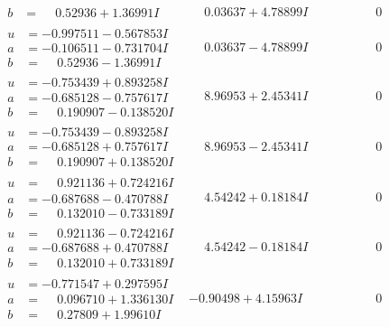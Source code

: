 \documentclass[1p]{elsarticle_modified}
\theoremstyle{definition}
\begin{document}
$$\begin{array}{c|c|c}
\begin{aligned}
b &= \phantom{-}0.52936 + 1.36991 I\end{aligned}
 & \phantom{-}0.03637 + 4.78899 I & \phantom{-0.000000 } 0 \\ \hline\begin{aligned}
u &= -0.997511 - 0.567853 I \\
a &= -0.106511 - 0.731704 I \\
b &= \phantom{-}0.52936 - 1.36991 I\end{aligned}
 & \phantom{-}0.03637 - 4.78899 I & \phantom{-0.000000 } 0 \\ \hline\begin{aligned}
u &= -0.753439 + 0.893258 I \\
a &= -0.685128 - 0.757617 I \\
b &= \phantom{-}0.190907 - 0.138520 I\end{aligned}
 & \phantom{-}8.96953 + 2.45341 I & \phantom{-0.000000 } 0 \\ \hline\begin{aligned}
u &= -0.753439 - 0.893258 I \\
a &= -0.685128 + 0.757617 I \\
b &= \phantom{-}0.190907 + 0.138520 I\end{aligned}
 & \phantom{-}8.96953 - 2.45341 I & \phantom{-0.000000 } 0 \\ \hline\begin{aligned}
u &= \phantom{-}0.921136 + 0.724216 I \\
a &= -0.687688 - 0.470788 I \\
b &= \phantom{-}0.132010 - 0.733189 I\end{aligned}
 & \phantom{-}4.54242 + 0.18184 I & \phantom{-0.000000 } 0 \\ \hline\begin{aligned}
u &= \phantom{-}0.921136 - 0.724216 I \\
a &= -0.687688 + 0.470788 I \\
b &= \phantom{-}0.132010 + 0.733189 I\end{aligned}
 & \phantom{-}4.54242 - 0.18184 I & \phantom{-0.000000 } 0 \\ \hline\begin{aligned}
u &= -0.771547 + 0.297595 I \\
a &= \phantom{-}0.096710 + 1.336130 I \\
b &= \phantom{-}0.27809 + 1.99610 I\end{aligned}
 & -0.90498 + 4.15963 I & \phantom{-0.000000 } 0 \\ \hline\begin{aligned}

\end{aligned}
\end{array}$$
\end{document}
